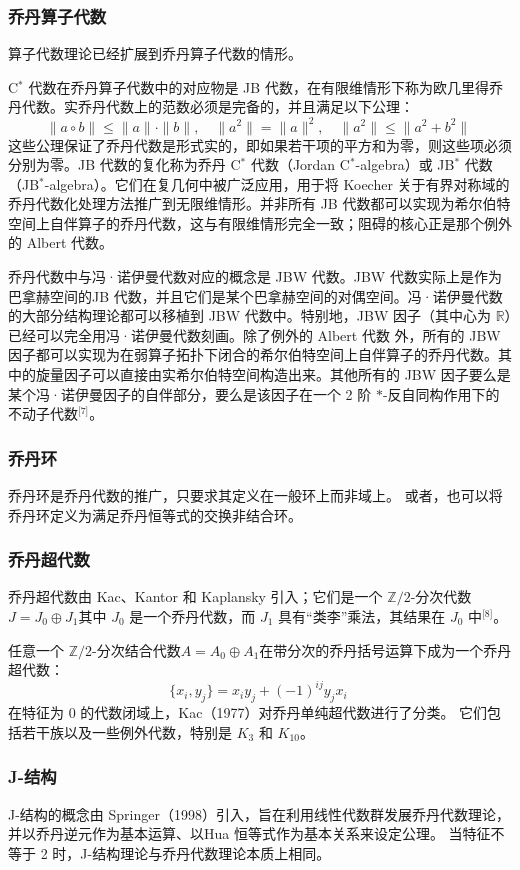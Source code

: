 \subsubsection{乔丹算子代数}
算子代数理论已经扩展到乔丹算子代数的情形。

C$^*$ 代数在乔丹算子代数中的对应物是 JB 代数，在有限维情形下称为欧几里得乔丹代数。实乔丹代数上的范数必须是完备的，并且满足以下公理：
$$
\|a \circ b\| \leq \|a\| \cdot \|b\|,\quad \|a^2\| = \|a\|^2,\quad \|a^2\| \leq \|a^2 + b^2\|~
$$
这些公理保证了乔丹代数是形式实的，即如果若干项的平方和为零，则这些项必须分别为零。JB 代数的复化称为乔丹 C$^*$ 代数（Jordan C$^*$-algebra）或 JB$^*$ 代数（JB$^*$-algebra）。它们在复几何中被广泛应用，用于将 Koecher 关于有界对称域的乔丹代数化处理方法推广到无限维情形。并非所有 JB 代数都可以实现为希尔伯特空间上自伴算子的乔丹代数，这与有限维情形完全一致；阻碍的核心正是那个例外的 Albert 代数。

乔丹代数中与冯·诺伊曼代数对应的概念是 JBW 代数。JBW 代数实际上是作为巴拿赫空间的JB 代数，并且它们是某个巴拿赫空间的对偶空间。冯·诺伊曼代数的大部分结构理论都可以移植到 JBW 代数中。特别地，JBW 因子（其中心为 $\mathbb{R}$）已经可以完全用冯·诺伊曼代数刻画。除了例外的 Albert 代数 外，所有的 JBW 因子都可以实现为在弱算子拓扑下闭合的希尔伯特空间上自伴算子的乔丹代数。其中的旋量因子可以直接由实希尔伯特空间构造出来。其他所有的 JBW 因子要么是某个冯·诺伊曼因子的自伴部分，要么是该因子在一个 2 阶 $*$-反自同构作用下的不动子代数\(^\text{[7]}\)。
\subsubsection{乔丹环}
乔丹环是乔丹代数的推广，只要求其定义在一般环上而非域上。
或者，也可以将乔丹环定义为满足乔丹恒等式的交换非结合环。
\subsubsection{乔丹超代数}
乔丹超代数由 Kac、Kantor 和 Kaplansky 引入；它们是一个 $\mathbb{Z} / 2$-分次代数$J = J_{0} \oplus J_{1}$其中 $J_{0}$ 是一个乔丹代数，而 $J_{1}$ 具有“类李”乘法，其结果在 $J_{0}$ 中\(^\text{[8]}\)。

任意一个 $\mathbb{Z} / 2$-分次结合代数$A = A_{0} \oplus A_{1}$在带分次的乔丹括号运算下成为一个乔丹超代数：
$$
\{x_{i}, y_{j}\} = x_{i}y_{j} + (-1)^{ij} y_{j}x_{i}~
$$
在特征为 0 的代数闭域上，Kac（1977）对乔丹单纯超代数进行了分类。
它们包括若干族以及一些例外代数，特别是 $K_{3}$ 和 $K_{10}$。
\subsubsection{J-结构}
J-结构的概念由 Springer（1998）引入，旨在利用线性代数群发展乔丹代数理论，并以乔丹逆元作为基本运算、以Hua 恒等式作为基本关系来设定公理。
当特征不等于 2 时，J-结构理论与乔丹代数理论本质上相同。
